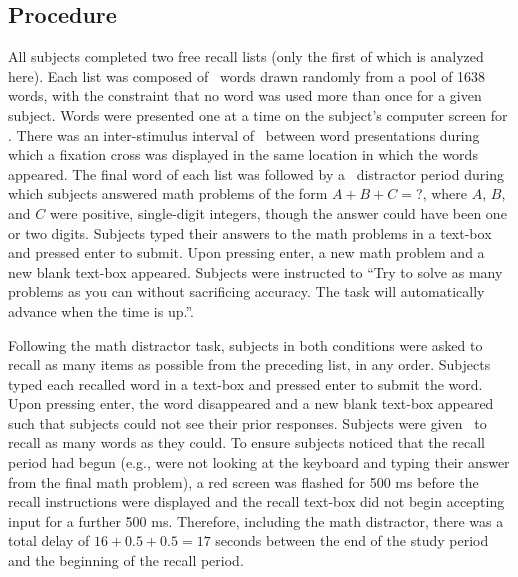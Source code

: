 \documentclass[man,natbib,floatsintext]{apa6} %
\begin{document}
\subsection{Procedure}
All subjects completed two free recall lists (only the first of which is analyzed here). Each list was composed of \listlength~words drawn randomly from a pool of 1638 words, with the constraint that no word was used more than once for a given subject. Words were presented one at a time on the subject's computer screen for \presrate. 
There was an inter-stimulus interval of \isi~between word presentations during which a fixation cross was displayed in the same location in which the words appeared. The final word of each list was followed by a \DFRDelay~distractor period during which subjects answered math problems of the form $A+B+C=$?, where $A$, $B$, and $C$ were positive, single-digit integers, though the answer could have been one or two digits. Subjects typed their answers to the math problems in a text-box and pressed enter to submit. Upon pressing enter, a new math problem and a new blank text-box appeared. Subjects were instructed to ``Try to solve as many problems as you can without sacrificing accuracy. The task will automatically advance when the time is up.''.

Following the math distractor task, subjects in both conditions were asked to recall as many items as possible from the preceding list, in any order. Subjects typed each recalled word in a text-box and pressed enter to submit the word. Upon pressing enter, the word disappeared and a new blank text-box appeared such that subjects could not see their prior responses. Subjects were given \recalltime~to recall as many words as they could. To ensure subjects noticed that the recall period had begun (e.g., were not looking at the keyboard and typing their answer from the final math problem), a red screen was flashed for 500 ms before the recall instructions were displayed and the recall text-box did not begin accepting input for a further 500 ms. Therefore, including the math distractor, there was a total delay of $16+0.5+0.5=17$ seconds between the end of the study period and the beginning of the recall period. 
\end{document}
